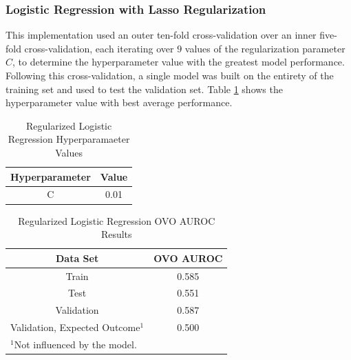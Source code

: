 \documentclass[conference]{IEEEtran}
\begin{document}
\subsubsection{Logistic Regression with Lasso Regularization}
This implementation used an outer ten-fold cross-validation over an inner five-fold cross-validation, each iterating over $9$ values of the regularization parameter $C$, to determine the hyperparameter value with the greatest model performance. Following this cross-validation, a single model was built on the entirety of the training set and used to test the validation set. Table \ref{tab8} shows the hyperparameter value with best average performance. 

\begin{table}[htbp]
\caption{Regularized Logistic Regression Hyperparamaeter Values}
\begin{center}
\begin{tabular}{|c||c|}
\hline
\textbf{Hyperparameter} & \textbf{Value} \\
\hline
\hline
C & 0.01 \\
\hline
\end{tabular}
\label{tab8}
\end{center}
\end{table}

\begin{table}[htbp]
\caption{Regularized Logistic Regression OVO AUROC Results}
\begin{center}
\begin{tabular}{|c||c|}
\hline
\textbf{Data Set} & \textbf{OVO AUROC} \\
\hline
\hline
Train & 0.585 \\
\hline
Test & 0.551 \\
\hline
Validation & 0.587 \\
\hline
Validation, Expected Outcome$^{\mathrm{1}}$ & 0.500 \\
\hline
\multicolumn{2}{l}{$^{\mathrm{1}}$Not influenced by the model.}
\end{tabular}
\label{tab9}
\end{center}
\end{table}
\end{document}
